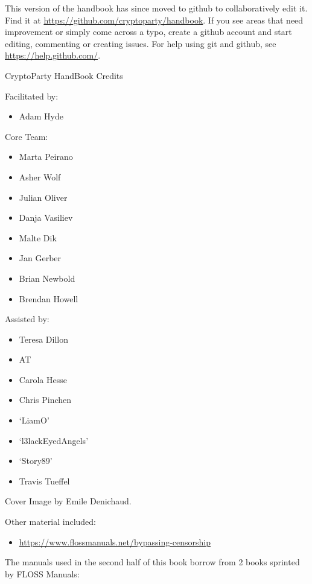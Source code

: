 This version of the handbook has since moved to github to
collaboratively edit it. Find it at
\href{https://github.com/cryptoparty/handbook}{https://github.com/cryptoparty/handbook}.
If you see areas that need improvement or simply come across a typo,
create a github account and start editing, commenting or creating
issues. For help using git and github, see
\href{https://help.github.com/}{https://help.github.com/}.

CryptoParty HandBook Credits

Facilitated by:

\begin{itemize}
\item
  Adam Hyde
\end{itemize}
Core Team:

\begin{itemize}
\item
  Marta Peirano
\item
  Asher Wolf
\item
  Julian Oliver
\item
  Danja Vasiliev
\item
  Malte Dik
\item
  Jan Gerber
\item
  Brian Newbold
\item
  Brendan Howell
\end{itemize}
Assisted by:

\begin{itemize}
\item
  Teresa Dillon
\item
  AT
\item
  Carola Hesse
\item
  Chris Pinchen
\item
  `LiamO'
\item
  `l3lackEyedAngels'
\item
  `Story89'
\item
  Travis Tueffel
\end{itemize}
Cover Image by Emile Denichaud.

Other material included:

\begin{itemize}
\item
  \href{https://www.flossmanuals.net/bypassing-censorship}{https://www.flossmanuals.net/bypassing-censorship}
\end{itemize}
The manuals used in the second half of this book borrow from 2 books
sprinted by FLOSS Manuals:

